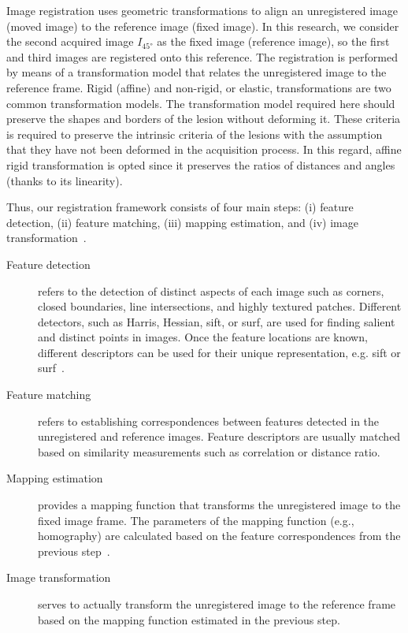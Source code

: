 Image registration uses geometric transformations to align an unregistered image (moved image) to the reference image (fixed image).
In this research, we consider the second acquired image $I_{\ang{45}}$ as the fixed image (reference image), so the first and third images are registered onto this reference.
The registration is performed by means of a transformation model that relates the unregistered image to the reference frame.
Rigid (affine) and non-rigid, or elastic, transformations are two common transformation models. 
The transformation model required here should preserve the shapes and borders of the lesion without deforming it.
These criteria is required to preserve the intrinsic criteria of the lesions with the assumption that they have not been deformed in the acquisition process.
In this regard, affine rigid transformation is opted since it preserves the ratios of distances and angles (thanks to its linearity).

Thus, our registration framework consists of four main steps: (i) feature detection, (ii) feature matching, (iii) mapping estimation, and (iv) image transformation~\cite{zitova2003image}.

\begin{description}
	\item[Feature detection] refers to the detection of distinct aspects of each image such as corners, closed boundaries, line intersections, and highly textured patches.
	Different detectors, such as Harris, Hessian, \ac{sift}, or \ac{surf}, are used for finding salient and distinct points in images.
	Once the feature locations are known, different descriptors can be used for their unique representation, e.g. \ac{sift} or \ac{surf}~\cite{bay2006surf}.	
	
	\item[Feature matching] refers to establishing correspondences between features detected in the unregistered and reference images.
	Feature descriptors are usually matched based on similarity measurements such as correlation or distance ratio.
	
	\item[Mapping estimation] provides a mapping function that transforms the unregistered image to the fixed image frame.
	The parameters of the mapping function (e.g., homography) are calculated based on the feature correspondences from the previous step~\cite{zitova2003image}.
	
	\item[Image transformation] serves to actually transform the unregistered image to the reference frame based on the mapping function estimated in the previous step.
\end{description}

